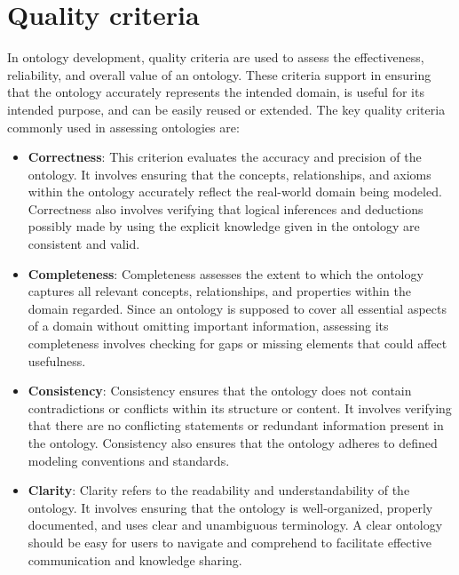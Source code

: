 

\section{Quality criteria}


In ontology development, quality criteria are used to assess the effectiveness, reliability, and overall value of an ontology. These criteria support in ensuring that the ontology accurately represents the intended domain, is useful for its intended purpose, and can be easily reused or extended. The key quality criteria commonly used in assessing ontologies are:

\begin{itemize}
    \item \textbf{Correctness}: This criterion evaluates the accuracy and precision of the ontology. It involves ensuring that the concepts, relationships, and axioms within the ontology accurately reflect the real-world domain being modeled. Correctness also involves verifying that logical inferences and deductions possibly made by using the explicit knowledge given in the ontology are consistent and valid.

    \item \textbf{Completeness}: Completeness assesses the extent to which the ontology captures all relevant concepts, relationships, and properties within the domain regarded. Since an ontology is supposed to cover all essential aspects of a domain without omitting important information, assessing its completeness involves checking for gaps or missing elements that could affect usefulness.

    \item \textbf{Consistency}: Consistency ensures that the ontology does not contain contradictions or conflicts within its structure or content. It involves verifying that there are no conflicting statements or redundant information present in the ontology. Consistency also ensures that the ontology adheres to defined modeling conventions and standards.

    \item \textbf{Clarity}: Clarity refers to the readability and understandability of the ontology. It involves ensuring that the ontology is well-organized, properly documented, and uses clear and unambiguous terminology. A clear ontology should be easy for users to navigate and comprehend to facilitate effective communication and knowledge sharing.


\end{itemize}
